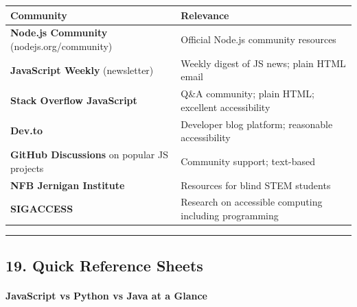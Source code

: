 \documentclass[
  justified,
  openright,
]{tufte-book}
\let\subsubsection\paragraph
\let\paragraph\paragraph
\let\subsubsection\paragraph
\let\paragraph\paragraph
\begin{document}
{\def\LTcaptype{none} %
\begin{longtable}[]{@{}
  >{\raggedright\arraybackslash}p{}
  >{\raggedright\arraybackslash}p{}@{}}
\toprule\noalign{}
\begin{minipage}[b]{\linewidth}\raggedright
Community
\end{minipage} & \begin{minipage}[b]{\linewidth}\raggedright
Relevance
\end{minipage} \\
\midrule\noalign{}
\endhead
\bottomrule\noalign{}
\endlastfoot
\textbf{Node.js Community} (nodejs.org/community) & Official Node.js
community resources \\
\textbf{JavaScript Weekly} (newsletter) & Weekly digest of JS news;
plain HTML email \\
\textbf{Stack Overflow JavaScript} & Q\&A community; plain HTML;
excellent accessibility \\
\textbf{Dev.to} & Developer blog platform; reasonable accessibility \\
\textbf{GitHub Discussions} on popular JS projects & Community support;
text-based \\
\textbf{NFB Jernigan Institute} & Resources for blind STEM students \\
\textbf{SIGACCESS} & Research on accessible computing including
programming \\
\end{longtable}
}

\begin{center}\rule{0.5\linewidth}{0.5pt}\end{center}

\subsection{19. Quick Reference Sheets}\label{quick-reference-sheets}

\subsubsection{JavaScript vs Python vs Java at a
Glance}\label{javascript-vs-python-vs-java-at-a-glance}
\end{document}
